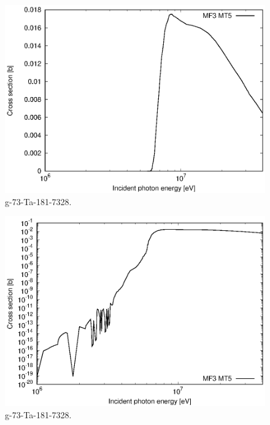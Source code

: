 \begin{figure}
 \includegraphics[width=\linewidth]{eps/g_73-Ta-181_7328.eps}
  \caption{g-73-Ta-181-7328.}
\end{figure}
\begin{figure}
 \includegraphics[width=\linewidth]{eps-log/g_73-Ta-181_7328.eps}
 \caption{g-73-Ta-181-7328.}
\end{figure}
\newpage \clearpage

